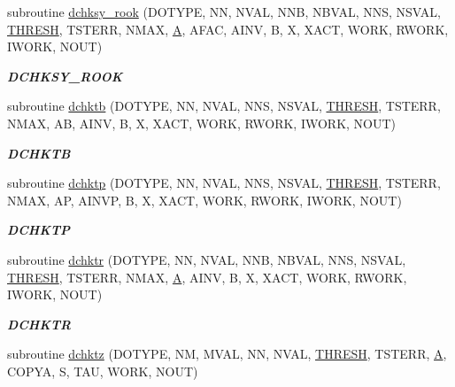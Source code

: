 \begin{DoxyCompactItemize}
subroutine \hyperlink{group__double__lin_ga910f3f0d54096e78c50dfa4b15be0609}{dchksy\+\_\+rook} (D\+O\+T\+Y\+P\+E, N\+N, N\+V\+A\+L, N\+N\+B, N\+B\+V\+A\+L, N\+N\+S, N\+S\+V\+A\+L, \hyperlink{zlaqgs_8c_a0656018abfc9fa2821827415f5d5ea57}{T\+H\+R\+E\+S\+H}, T\+S\+T\+E\+R\+R, N\+M\+A\+X, \hyperlink{classA}{A}, A\+F\+A\+C, A\+I\+N\+V, B, X, X\+A\+C\+T, W\+O\+R\+K, R\+W\+O\+R\+K, I\+W\+O\+R\+K, N\+O\+U\+T)
\begin{DoxyCompactList}\small\item\em {\bfseries D\+C\+H\+K\+S\+Y\+\_\+\+R\+O\+O\+K} \end{DoxyCompactList}\item 
subroutine \hyperlink{group__double__lin_ga6c72fd731e9f9fdb0f0debcf2665eae8}{dchktb} (D\+O\+T\+Y\+P\+E, N\+N, N\+V\+A\+L, N\+N\+S, N\+S\+V\+A\+L, \hyperlink{zlaqgs_8c_a0656018abfc9fa2821827415f5d5ea57}{T\+H\+R\+E\+S\+H}, T\+S\+T\+E\+R\+R, N\+M\+A\+X, A\+B, A\+I\+N\+V, B, X, X\+A\+C\+T, W\+O\+R\+K, R\+W\+O\+R\+K, I\+W\+O\+R\+K, N\+O\+U\+T)
\begin{DoxyCompactList}\small\item\em {\bfseries D\+C\+H\+K\+T\+B} \end{DoxyCompactList}\item 
subroutine \hyperlink{group__double__lin_ga91eac4b16aeafc6eeec057c680ae4161}{dchktp} (D\+O\+T\+Y\+P\+E, N\+N, N\+V\+A\+L, N\+N\+S, N\+S\+V\+A\+L, \hyperlink{zlaqgs_8c_a0656018abfc9fa2821827415f5d5ea57}{T\+H\+R\+E\+S\+H}, T\+S\+T\+E\+R\+R, N\+M\+A\+X, A\+P, A\+I\+N\+V\+P, B, X, X\+A\+C\+T, W\+O\+R\+K, R\+W\+O\+R\+K, I\+W\+O\+R\+K, N\+O\+U\+T)
\begin{DoxyCompactList}\small\item\em {\bfseries D\+C\+H\+K\+T\+P} \end{DoxyCompactList}\item 
subroutine \hyperlink{group__double__lin_gab02349bfeba255144e36ea0dc3691e5a}{dchktr} (D\+O\+T\+Y\+P\+E, N\+N, N\+V\+A\+L, N\+N\+B, N\+B\+V\+A\+L, N\+N\+S, N\+S\+V\+A\+L, \hyperlink{zlaqgs_8c_a0656018abfc9fa2821827415f5d5ea57}{T\+H\+R\+E\+S\+H}, T\+S\+T\+E\+R\+R, N\+M\+A\+X, \hyperlink{classA}{A}, A\+I\+N\+V, B, X, X\+A\+C\+T, W\+O\+R\+K, R\+W\+O\+R\+K, I\+W\+O\+R\+K, N\+O\+U\+T)
\begin{DoxyCompactList}\small\item\em {\bfseries D\+C\+H\+K\+T\+R} \end{DoxyCompactList}\item 
subroutine \hyperlink{group__double__lin_ga69077db179ac8bab53f2deaef9e38d70}{dchktz} (D\+O\+T\+Y\+P\+E, N\+M, M\+V\+A\+L, N\+N, N\+V\+A\+L, \hyperlink{zlaqgs_8c_a0656018abfc9fa2821827415f5d5ea57}{T\+H\+R\+E\+S\+H}, T\+S\+T\+E\+R\+R, \hyperlink{classA}{A}, C\+O\+P\+Y\+A, S, T\+A\+U, W\+O\+R\+K, N\+O\+U\+T)

\end{DoxyCompactItemize}
